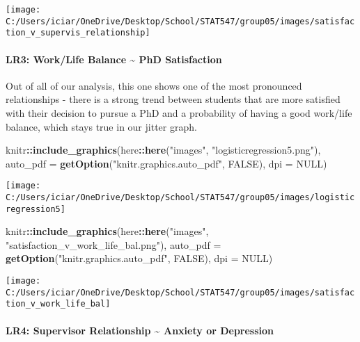 \documentclass[
]{article}
\newenvironment{Shaded}{\begin{snugshade}}{\end{snugshade}}
\newcommand{\DataTypeTok}[1]{\textcolor[rgb]{0.13,0.29,0.53}{#1}}
\newcommand{\KeywordTok}[1]{\textcolor[rgb]{0.13,0.29,0.53}{\textbf{#1}}}
\newcommand{\NormalTok}[1]{#1}
\newcommand{\OperatorTok}[1]{\textcolor[rgb]{0.81,0.36,0.00}{\textbf{#1}}}
\newcommand{\OtherTok}[1]{\textcolor[rgb]{0.56,0.35,0.01}{#1}}
\newcommand{\StringTok}[1]{\textcolor[rgb]{0.31,0.60,0.02}{#1}}
\begin{document}
\texttt{[image: C:/Users/iciar/OneDrive/Desktop/School/STAT547/group05/images/satisfaction\_v\_supervis\_relationship]}

\hypertarget{lr3-worklife-balance-phd-satisfaction}{%
\paragraph{LR3: Work/Life Balance \textasciitilde{} PhD
Satisfaction}\label{lr3-worklife-balance-phd-satisfaction}}

Out of all of our analysis, this one shows one of the most pronounced
relationships - there is a strong trend between students that are more
satisfied with their decision to pursue a PhD and a probability of
having a good work/life balance, which stays true in our jitter graph.

\begin{Shaded}
\begin{Highlighting}[]
\NormalTok{knitr}\OperatorTok{::}\KeywordTok{include_graphics}\NormalTok{(here}\OperatorTok{::}\KeywordTok{here}\NormalTok{(}\StringTok{"images"}\NormalTok{, }\StringTok{"logisticregression5.png"}\NormalTok{), }\DataTypeTok{auto_pdf =} \KeywordTok{getOption}\NormalTok{(}\StringTok{"knitr.graphics.auto_pdf"}\NormalTok{, }\OtherTok{FALSE}\NormalTok{), }
    \DataTypeTok{dpi =} \OtherTok{NULL}\NormalTok{)}
\end{Highlighting}
\end{Shaded}

\texttt{[image: C:/Users/iciar/OneDrive/Desktop/School/STAT547/group05/images/logisticregression5]}

\begin{Shaded}
\begin{Highlighting}[]
\NormalTok{knitr}\OperatorTok{::}\KeywordTok{include_graphics}\NormalTok{(here}\OperatorTok{::}\KeywordTok{here}\NormalTok{(}\StringTok{"images"}\NormalTok{, }\StringTok{"satisfaction_v_work_life_bal.png"}\NormalTok{), }\DataTypeTok{auto_pdf =} \KeywordTok{getOption}\NormalTok{(}\StringTok{"knitr.graphics.auto_pdf"}\NormalTok{, }\OtherTok{FALSE}\NormalTok{), }
    \DataTypeTok{dpi =} \OtherTok{NULL}\NormalTok{)}
\end{Highlighting}
\end{Shaded}

\texttt{[image: C:/Users/iciar/OneDrive/Desktop/School/STAT547/group05/images/satisfaction\_v\_work\_life\_bal]}

\hypertarget{lr4-supervisor-relationship-anxiety-or-depression}{%
\paragraph{LR4: Supervisor Relationship \textasciitilde{} Anxiety or
Depression}\label{lr4-supervisor-relationship-anxiety-or-depression}}
\end{document}
